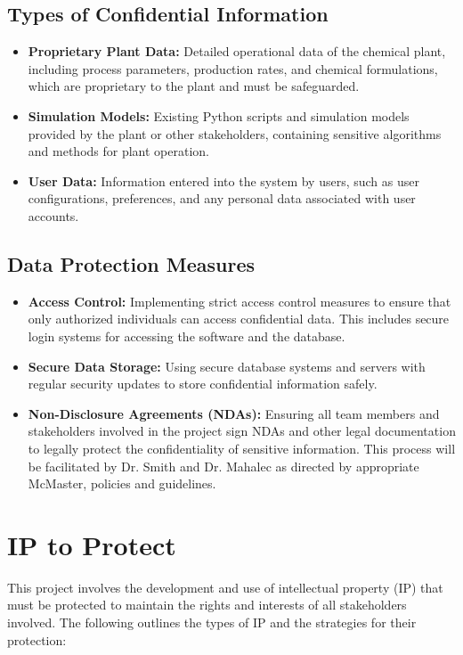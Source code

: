 \documentclass{article}
\begin{document}
\subsection*{Types of Confidential Information}
\begin{itemize}
    \item \textbf{Proprietary Plant Data:} Detailed operational data of the chemical plant, including process parameters, production rates, and chemical formulations, which are proprietary to the plant and must be safeguarded.
    \item \textbf{Simulation Models:} Existing Python scripts and simulation models provided by the plant or other stakeholders, containing sensitive algorithms and methods for plant operation.
    \item \textbf{User Data:} Information entered into the system by users, such as user configurations, preferences, and any personal data associated with user accounts.
\end{itemize}

\subsection*{Data Protection Measures}
\begin{itemize}
    \item \textbf{Access Control:} Implementing strict access control measures to ensure that only authorized individuals can access confidential data. This includes secure login systems for accessing the software and the database.
    \item \textbf{Secure Data Storage:} Using secure database systems and servers with regular security updates to store confidential information safely.
    \item \textbf{Non-Disclosure Agreements (NDAs):} Ensuring all team members and stakeholders involved in the project sign NDAs and other legal documentation to legally protect the confidentiality of sensitive information. This process will be facilitated by Dr. Smith and Dr. Mahalec as directed by appropriate McMaster, policies and guidelines.

\end{itemize}

\section{IP to Protect}
This project involves the development and use of intellectual property (IP) that must be protected to maintain the rights and interests of all stakeholders involved. The following outlines the types of IP and the strategies for their protection:
\end{document}
